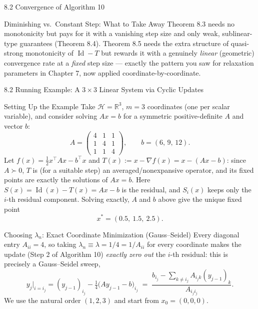 \documentclass[aspectratio=169,10pt]{beamer}
\newcommand{\R}{\mathbb{R}}
\newcommand{\Hsp}{\mathcal H}
\newcommand{\Id}{\operatorname{Id}}
\begin{document}
\begin{frame}[allowframebreaks]{8.2 Convergence of Algorithm 10}
\begin{alertblock}{Diminishing vs.\ Constant Step: What to Take Away}
Theorem 8.3 needs no monotonicity but pays for it with a vanishing step size and only weak, sublinear-type guarantees (Theorem 8.4). Theorem 8.5 needs the extra structure of quasi-strong monotonicity of $\Id-T$ but rewards it with a genuinely \emph{linear} (geometric) convergence rate at a \emph{fixed} step size --- exactly the pattern you saw for relaxation parameters in Chapter 7, now applied coordinate-by-coordinate.
\end{alertblock}

\end{frame}

\begin{frame}[allowframebreaks]{8.2 Running Example: A $3\times3$ Linear System via Cyclic Updates}

\begin{alertblock}{Setting Up the Example}
Take $\Hsp=\R^3$, $m=3$ coordinates (one per scalar variable), and consider solving $Ax=b$ for a symmetric positive-definite $A$ and vector $b$:
\[
  A = \begin{pmatrix} 4 & 1 & 1 \\ 1 & 4 & 1 \\ 1 & 1 & 4 \end{pmatrix}, \qquad b = (6,\,9,\,12).
\]
Let $f(x)=\tfrac12 x^\top A x - b^\top x$ and $T(x) := x - \nabla f(x) = x-(Ax-b)$: since $A\succ 0$, $T$ is (for a suitable step) an averaged/nonexpansive operator, and its fixed points are exactly the solutions of $Ax=b$. Here $S(x)=\Id(x)-T(x) = Ax-b$ is the residual, and $S_i(x)$ keeps only the $i$-th residual component. Solving exactly, $A$ and $b$ above give the unique fixed point
\[
  x^* = (0.5,\ 1.5,\ 2.5).
\]
\end{alertblock}

\begin{block}{Choosing $\lambda_n$: Exact Coordinate Minimization (Gauss--Seidel)}
Every diagonal entry $A_{ii}=4$, so taking $\lambda_n\equiv\lambda=1/4=1/A_{ii}$ for every coordinate makes the update (Step 2 of Algorithm 10) \emph{exactly zero out} the $i$-th residual: this is precisely a Gauss--Seidel sweep,
\[
  y_j \Big|_{i=i_j} = (y_{j-1})_{i_j} - \tfrac14\bigl(A y_{j-1}-b\bigr)_{i_j} \;=\; \frac{b_{i_j}-\sum_{k\ne i_j}A_{i_j k}(y_{j-1})_k}{A_{i_j i_j}}.
\]
We use the natural order $(1,2,3)$ and start from $x_0=(0,0,0)$.
\end{block}

\framebreak


\end{frame}
\end{document}
